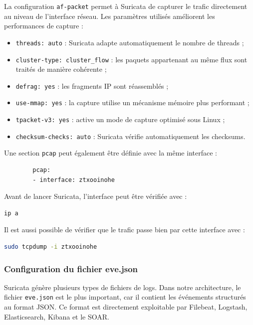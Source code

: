 \documentclass[12pt,a4paper,oneside]{report}
\begin{document}
	La configuration \texttt{af-packet} permet à Suricata de capturer le trafic directement au niveau de l'interface réseau. Les paramètres utilisés améliorent les performances de capture :
	
	\begin{itemize}
		\item \texttt{threads: auto} : Suricata adapte automatiquement le nombre de threads ;
		\item \texttt{cluster-type: cluster\_flow} : les paquets appartenant au même flux sont traités de manière cohérente ;
		\item \texttt{defrag: yes} : les fragments IP sont réassemblés ;
		\item \texttt{use-mmap: yes} : la capture utilise un mécanisme mémoire plus performant ;
		\item \texttt{tpacket-v3: yes} : active un mode de capture optimisé sous Linux ;
		\item \texttt{checksum-checks: auto} : Suricata vérifie automatiquement les checksums.
	\end{itemize}
	
	Une section \texttt{pcap} peut également être définie avec la même interface :
	
	\begin{lstlisting}
		pcap:
		- interface: ztxooinohe
	\end{lstlisting}
	
	Avant de lancer Suricata, l'interface peut être vérifiée avec :
	
	\begin{lstlisting}[language=bash]
		ip a
	\end{lstlisting}
	
	Il est aussi possible de vérifier que le trafic passe bien par cette interface avec :
	
	\begin{lstlisting}[language=bash]
		sudo tcpdump -i ztxooinohe
	\end{lstlisting}
	
	\subsubsection{Configuration du fichier eve.json}
	
	Suricata génère plusieurs types de fichiers de logs. Dans notre architecture, le fichier \texttt{eve.json} est le plus important, car il contient les événements structurés au format JSON. Ce format est directement exploitable par Filebeat, Logstash, Elasticsearch, Kibana et le SOAR.
	
\end{document}
